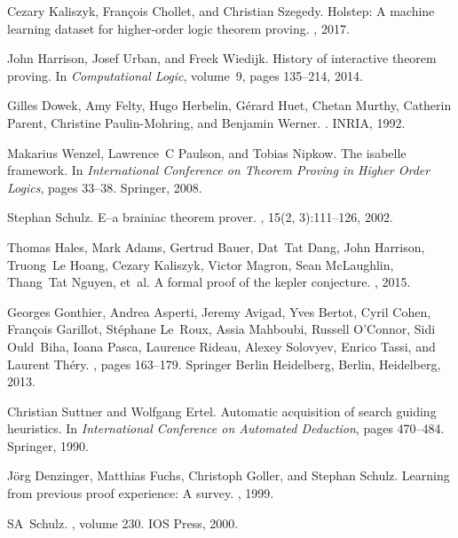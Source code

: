 \documentclass{article}
\begin{document}
\begin{thebibliography}{10}
Cezary Kaliszyk, Fran{\c{c}}ois Chollet, and Christian Szegedy.
\newblock Holstep: A machine learning dataset for higher-order logic theorem
  proving.
, 2017.

John Harrison, Josef Urban, and Freek Wiedijk.
\newblock History of interactive theorem proving.
\newblock In {\em Computational Logic}, volume~9, pages 135--214, 2014.

Gilles Dowek, Amy Felty, Hugo Herbelin, G{\'e}rard Huet, Chetan Murthy,
  Catherin Parent, Christine Paulin-Mohring, and Benjamin Werner.
.
\newblock INRIA, 1992.

Makarius Wenzel, Lawrence~C Paulson, and Tobias Nipkow.
\newblock The isabelle framework.
\newblock In {\em International Conference on Theorem Proving in Higher Order
  Logics}, pages 33--38. Springer, 2008.

Stephan Schulz.
\newblock E--a brainiac theorem prover.
, 15(2, 3):111--126, 2002.

Thomas Hales, Mark Adams, Gertrud Bauer, Dat~Tat Dang, John Harrison, Truong~Le
  Hoang, Cezary Kaliszyk, Victor Magron, Sean McLaughlin, Thang~Tat Nguyen,
  et~al.
\newblock A formal proof of the kepler conjecture.
, 2015.

Georges Gonthier, Andrea Asperti, Jeremy Avigad, Yves Bertot, Cyril Cohen,
  Fran{\c{c}}ois Garillot, St{\'e}phane Le~Roux, Assia Mahboubi, Russell
  O'Connor, Sidi Ould~Biha, Ioana Pasca, Laurence Rideau, Alexey Solovyev,
  Enrico Tassi, and Laurent Th{\'e}ry.
, pages
  163--179.
\newblock Springer Berlin Heidelberg, Berlin, Heidelberg, 2013.

Christian Suttner and Wolfgang Ertel.
\newblock Automatic acquisition of search guiding heuristics.
\newblock In {\em International Conference on Automated Deduction}, pages
  470--484. Springer, 1990.

J{\"o}rg Denzinger, Matthias Fuchs, Christoph Goller, and Stephan Schulz.
\newblock Learning from previous proof experience: A survey.
, 1999.

SA~Schulz.
,
  volume 230.
\newblock IOS Press, 2000.


\end{thebibliography}
\end{document}
